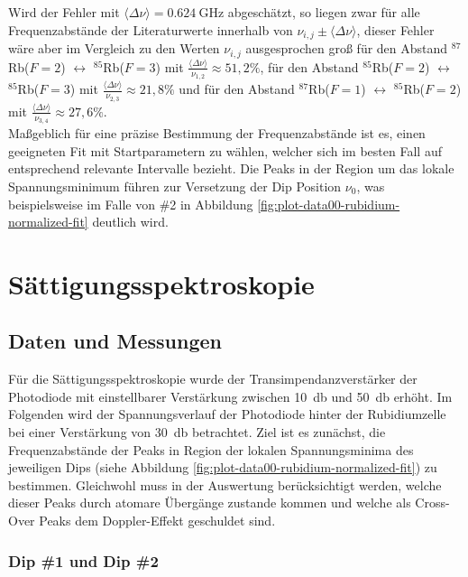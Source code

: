 \noindent Wird der Fehler mit $\langle \Delta \nu \rangle = \SI{0,624}{\giga \hertz}$ abgeschätzt, so liegen zwar für alle Frequenzabstände der Literaturwerte innerhalb von $\nu_{i,j} \pm \langle \Delta \nu \rangle$, dieser Fehler wäre aber im Vergleich zu den Werten $\nu_{i,j}$ ausgesprochen groß für den Abstand $^{87}$Rb($F = 2$) $\longleftrightarrow$ $^{85}$Rb($F = 3$) mit $\tfrac{\langle \Delta \nu \rangle}{\nu_{1,2}} \approx 51,2\%$, für den Abstand $^{85}$Rb($F = 2$) $\longleftrightarrow$ $^{85}$Rb($F = 3$) mit $\tfrac{\langle \Delta \nu \rangle}{\nu_{2,3}} \approx 21,8 \%$ und für den Abstand $^{87}$Rb($F = 1$) $\longleftrightarrow$ $^{85}$Rb($F = 2$) mit $\tfrac{\langle \Delta \nu \rangle}{\nu_{3,4}} \approx 27,6\%$. \\

\noindent Maßgeblich für eine präzise Bestimmung der Frequenzabstände ist es, einen geeigneten Fit mit Startparametern zu wählen, welcher sich im besten Fall auf entsprechend relevante Intervalle bezieht. Die Peaks in der Region um das lokale Spannungsminimum führen zur Versetzung der Dip Position $\nu_{0}$, was beispielsweise im Falle von \textcolor{green!50!black}{\#2} in Abbildung \ref{fig:plot-data00-rubidium-normalized-fit} deutlich wird.


\section{Sättigungsspektroskopie}

\subsection{Daten und Messungen}

\noindent Für die Sättigungsspektroskopie wurde der Transimpendanzverstärker der Photodiode mit einstellbarer Verstärkung zwischen \SI{10}{\decibel} und \SI{50}{\decibel} erhöht. Im Folgenden wird der Spannungsverlauf der Photodiode hinter der Rubidiumzelle bei einer Verstärkung von \SI{30}{\decibel} betrachtet.
Ziel ist es zunächst, die Frequenzabstände der Peaks in Region der lokalen Spannungsminima des jeweiligen Dips (siehe Abbildung \ref{fig:plot-data00-rubidium-normalized-fit}) zu bestimmen. Gleichwohl muss in der Auswertung berücksichtigt werden, welche dieser Peaks durch atomare Übergänge zustande kommen und welche als Cross-Over Peaks dem Doppler-Effekt geschuldet sind.

\subsubsection{Dip \textcolor{red!80!black}{\#1} und Dip \textcolor{green!50!black}{\#2}}

